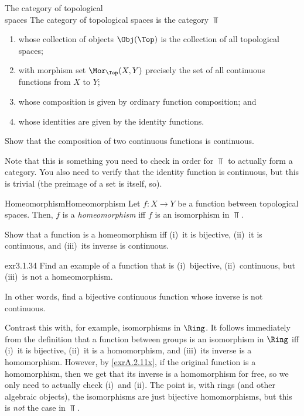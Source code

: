 \begin{exm}{The category of topological \\ spaces}{}
The category of topological spaces is the category $\Top$\index[notation]{$\Top$}
\begin{enumerate}
\item whose collection of objects $\Obj (\Top )$ is the collection of all topological spaces;
\item with morphism set $\Mor _{\Top}(X,Y)$ precisely the set of all continuous functions from $X$ to $Y$;
\item whose composition is given by ordinary function composition; and
\item whose identities are given by the identity functions.
\end{enumerate}
\begin{exr}[breakable=false]{}{}
Show that the composition of two continuous functions is continuous.
\begin{rmk}
Note that this is something you need to check in order for $\Top$ to actually form a category.  You also need to verify that the identity function is continuous, but this is trivial (the preimage of a set is itself, so\textellipsis ).
\end{rmk}
\end{exr}
\end{exm}
\begin{dfn}{Homeomorphism}{Homeomorphism}
Let $f\colon X\rightarrow Y$ be a function between topological spaces.  Then, $f$ is a \emph{homeomorphism} iff $f$ is an isomorphism in $\Top$.
\end{dfn}
\begin{exr}{}{}
Show that a function is a homeomorphism iff (i)~it is bijective, (ii)~it is continuous, and (iii)~its inverse is continuous.
\end{exr}
\begin{exr}{}{exr3.1.34}
Find an example of a function that is (i)~bijective, (ii)~continuous, but (iii)~is not a homeomorphism.
\begin{rmk}
In other words, find a bijective continuous function whose inverse is not continuous.
\end{rmk}
\begin{rmk}
Contrast this with, for example, isomorphisms in $\Ring$.  It follows immediately from the definition that a function between groups is an isomorphism in $\Ring$ iff (i)~it is bijective, (ii)~it is a homomorphism, and (iii)~its inverse is a homomorphism.  However, by \cref{exrA.2.11x}, if the original function is a homomorphism, then we get that its inverse is a homomorphism for free, so we only need to actually check (i)~and (ii).  The point is, with rings (and other algebraic objects), the isomorphisms are just bijective homomorphisms, but this is \emph{not} the case in $\Top$.
\end{rmk}
\end{exr}
